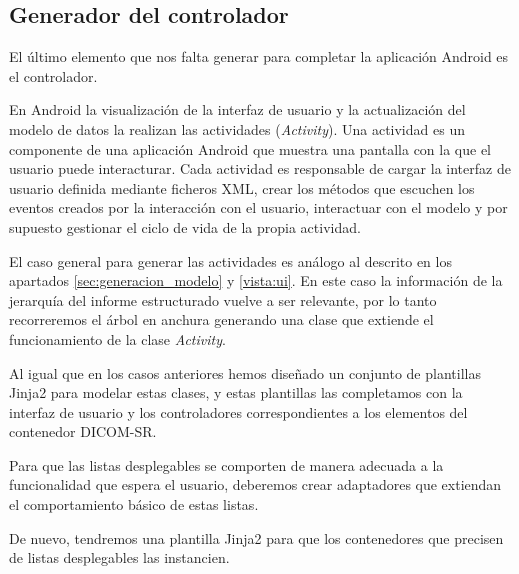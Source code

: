 \subsection{Generador del controlador}

El último elemento que nos falta generar para completar la aplicación Android es el controlador. \par
En Android la visualización de la interfaz de usuario y la actualización del modelo de datos la realizan las actividades (\emph{Activity}). Una actividad es un componente de una aplicación Android que muestra una pantalla con la que el usuario puede interacturar. Cada actividad es responsable de cargar la interfaz de usuario definida mediante ficheros XML, crear los métodos que escuchen los eventos creados por la interacción con el usuario, interactuar con el modelo y por supuesto gestionar el ciclo de vida de la propia actividad.\medskip\par

El caso general para generar las actividades es análogo al descrito en los apartados \ref{sec:generacion_modelo} y \ref{vista:ui}. En este caso la información de la jerarquía del informe estructurado vuelve a ser relevante, por lo tanto recorreremos el árbol en anchura generando una clase que extiende el funcionamiento de la clase \emph{Activity}.\par
Al igual que en los casos anteriores hemos diseñado un conjunto de plantillas Jinja2 para modelar estas clases, y estas plantillas las completamos con la interfaz de usuario y los controladores correspondientes a los elementos del contenedor DICOM-SR.\medskip\par 

Para que las listas desplegables se comporten de manera adecuada a la funcionalidad que espera el usuario, deberemos crear adaptadores que extiendan el comportamiento básico de estas listas.\par
De nuevo, tendremos una plantilla Jinja2 para que los contenedores que precisen de listas desplegables las instancien.\medskip\par

